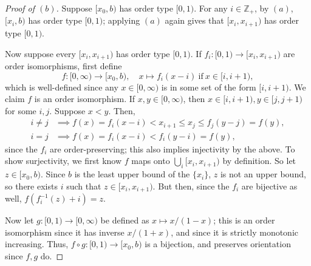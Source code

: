 \documentclass[12pt]{article}
\theoremstyle{remark}
\begin{document}
\begin{proof}[Proof of $(b)$]
  Suppose $[x_0,b)$ has order type $[0,1)$. For any $i \in \mathbb{Z}_+$, by $(a)$, $[x_i,b)$ has order type $[0,1)$; applying $(a)$ again gives that $[x_i,x_{i+1})$ has order type $[0,1)$.
  \par Now suppose every $[x_i,x_{i+1})$ has order type $[0,1)$. If $f_i\colon [0,1) \to [x_i,x_{i+1})$ are order isomorphisms, first define
  \begin{equation*}
    f\colon [0,\infty) \to [x_0,b), \quad x \mapsto f_i(x-i)~\text{if}~x \in [i,i+1),
  \end{equation*}
  which is well-defined since any $x \in [0,\infty)$ is in some set of the form $[i,i+1)$. We claim $f$ is an order isomorphism. If $x,y \in [0,\infty)$, then $x \in [i,i+1), y \in [j,j+1)$ for some $i,j$. Suppose $x<y$. Then,
  \begin{align*}
    i \ne j &\implies f(x) = f_i(x-i) < x_{i+1} \le x_j \le f_j(y-j) = f(y),\\
    i = j &\implies f(x) = f_i(x-i) < f_i(y-i) = f(y),
  \end{align*}
  since the $f_i$ are order-preserving; this also implies injectivity by the above. To show surjectivity, we first know $f$ maps onto $\bigcup_i [x_i,x_{i+1})$ by definition. So let $z \in [x_0,b)$. Since $b$ is the least upper bound of the $\{x_i\}$, $z$ is not an upper bound, so there exists $i$ such that $z \in [x_i,x_{i+1})$. But then, since the $f_i$ are bijective as well, $f(f_i^{-1}(z)+i) = z$.
  \par Now let $g\colon [0,1) \to [0,\infty)$ be defined as $x \mapsto x/(1-x)$;
    this is an order isomorphism since it has inverse $x/(1+x)$, and since it is
    strictly monotonic increasing. Thus, $f \circ g\colon [0,1) \to [x_0,b)$ is a bijection, and preserves orientation since $f,g$ do.
\end{proof}
\end{document}
